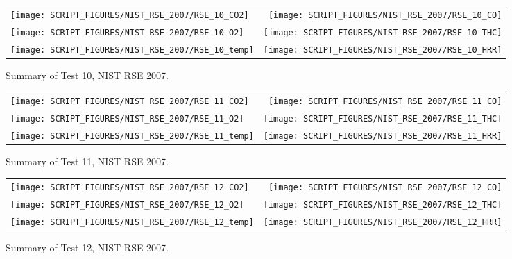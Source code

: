 \begin{figure}[p]
\begin{tabular*}{\textwidth}{l@{\extracolsep{\fill}}r}
\texttt{[image: SCRIPT\_FIGURES/NIST\_RSE\_2007/RSE\_10\_CO2]} &
\texttt{[image: SCRIPT\_FIGURES/NIST\_RSE\_2007/RSE\_10\_CO]} \\
\texttt{[image: SCRIPT\_FIGURES/NIST\_RSE\_2007/RSE\_10\_O2]} &
\texttt{[image: SCRIPT\_FIGURES/NIST\_RSE\_2007/RSE\_10\_THC]} \\
\texttt{[image: SCRIPT\_FIGURES/NIST\_RSE\_2007/RSE\_10\_temp]} &
\texttt{[image: SCRIPT\_FIGURES/NIST\_RSE\_2007/RSE\_10\_HRR]}
\end{tabular*}
\caption[Summary of Test 10, NIST RSE 2007]{Summary of Test 10, NIST RSE 2007.}
\label{NIST_RSE_2007_10}
\end{figure}

\begin{figure}[p]
\begin{tabular*}{\textwidth}{l@{\extracolsep{\fill}}r}
\texttt{[image: SCRIPT\_FIGURES/NIST\_RSE\_2007/RSE\_11\_CO2]} &
\texttt{[image: SCRIPT\_FIGURES/NIST\_RSE\_2007/RSE\_11\_CO]} \\
\texttt{[image: SCRIPT\_FIGURES/NIST\_RSE\_2007/RSE\_11\_O2]} &
\texttt{[image: SCRIPT\_FIGURES/NIST\_RSE\_2007/RSE\_11\_THC]} \\
\texttt{[image: SCRIPT\_FIGURES/NIST\_RSE\_2007/RSE\_11\_temp]} &
\texttt{[image: SCRIPT\_FIGURES/NIST\_RSE\_2007/RSE\_11\_HRR]}
\end{tabular*}
\caption[Summary of Test 11, NIST RSE 2007]{Summary of Test 11, NIST RSE 2007.}
\label{NIST_RSE_2007_11}
\end{figure}

\begin{figure}[p]
\begin{tabular*}{\textwidth}{l@{\extracolsep{\fill}}r}
\texttt{[image: SCRIPT\_FIGURES/NIST\_RSE\_2007/RSE\_12\_CO2]} &
\texttt{[image: SCRIPT\_FIGURES/NIST\_RSE\_2007/RSE\_12\_CO]} \\
\texttt{[image: SCRIPT\_FIGURES/NIST\_RSE\_2007/RSE\_12\_O2]} &
\texttt{[image: SCRIPT\_FIGURES/NIST\_RSE\_2007/RSE\_12\_THC]} \\
\texttt{[image: SCRIPT\_FIGURES/NIST\_RSE\_2007/RSE\_12\_temp]} &
\texttt{[image: SCRIPT\_FIGURES/NIST\_RSE\_2007/RSE\_12\_HRR]}
\end{tabular*}
\caption[Summary of Test 12, NIST RSE 2007]{Summary of Test 12, NIST RSE 2007.}
\label{NIST_RSE_2007_12}
\end{figure}

